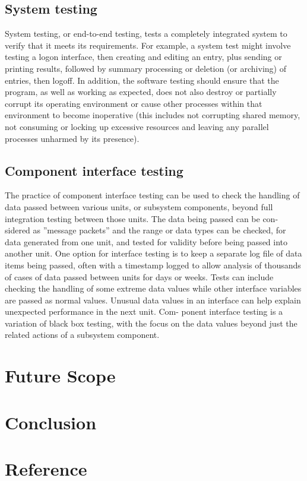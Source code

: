 \documentclass{article}
\begin{document}
\subsection{System testing}

System testing, or end-to-end testing, tests a completely integrated system to verify that it meets its requirements. For example, a system test might involve testing a logon interface, then creating and editing an entry, plus sending or printing results, followed by summary processing or deletion (or archiving) of entries, then logoff.
In addition, the software testing should ensure that the program, as well as working as expected, does not also destroy or partially corrupt its operating environment or cause other processes within that environment to become inoperative (this includes not corrupting shared memory, not consuming or locking up excessive resources and leaving any parallel processes unharmed by its presence).

\subsection{Component interface testing}
The practice of component interface testing can be used to check the handling of data passed between various units, or subsystem components, beyond full integration testing between those units. The data being passed can be con- sidered as ”message packets” and the range or data types can be checked, for data generated from one unit, and tested for validity before being passed into another unit. One option for interface testing is to keep a separate log file of data items being passed, often with a timestamp logged to allow analysis of thousands of cases of data passed between units for days or weeks. Tests can include checking the handling of some extreme data values while other interface variables are passed as normal values. Unusual data values in an interface can help explain unexpected performance in the next unit. Com- ponent interface testing is a variation of black box testing, with the focus on the data values beyond just the related actions of a subsystem component.

\newpage

\section{Future Scope}
\vspace{1em}

\newpage

\section{Conclusion}
\vspace{1em}

\newpage


\section{Reference}
\vspace{1em}


\newpage
\end{document}
